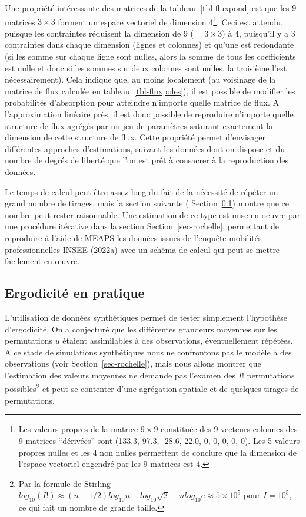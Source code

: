 \documentclass[
  10pt,
  a4paper,
  numbers=noendperiod,
  DIV=12]{scrartcl}
\begin{document}
Une propriété intéressante des matrices de la tableau~\ref{tbl-fluxpond}
est que les 9 matrices \(3 \times 3\) forment un espace vectoriel de
dimension 4\footnote{Les valeurs propres de la matrice \(9 \times 9\)
  constituée des 9 vecteurs colonnes des 9 matrices ``dérivées'' sont
  (133.3, 97.3, -28.6, 22.0, 0, 0, 0, 0, 0). Les 5 valeurs propres
  nulles et les 4 non nulles permettent de conclure que la dimension de
  l'espace vectoriel engendré par les 9 matrices est 4.}. Ceci est
attendu, puisque les contraintes réduisent la dimension de 9
(\(=3\times 3\)) à 4, puisqu'il y a 3 contraintes dans chaque dimension
(lignes et colonnes) et qu'une est redondante (si les somme sur chaque
ligne sont nulles, alors la somme de tous les coefficients est nulle et
donc si les sommes sur deux colonnes sont nulles, la troisième l'est
nécessairement). Cela indique que, au moins localement (au voisinage de
la matrice de flux calculée en tableau~\ref{tbl-fluxpoles}), il est
possible de modifier les probabilités d'absorption pour atteindre
n'importe quelle matrice de flux. A l'approximation linéaire près, il
est donc possible de reproduire n'importe quelle structure de flux
agrégés par un jeu de paramètres saturant exactement la dimension de
cette structure de flux. Cette propriété permet d'envisager différentes
approches d'estimations, suivant les données dont on dispose et du
nombre de degrés de liberté que l'on est prêt à consacrer à la
reproduction des données.

Le temps de calcul peut être assez long du fait de la nécessité de
répéter un grand nombre de tirages, mais la section suivante (
Section~\ref{sec-ergemp}) montre que ce nombre peut rester raisonnable.
Une estimation de ce type est mise en oeuvre par une procédure itérative
dans la section Section~\ref{sec-rochelle}, permettant de reproduire à
l'aide de MEAPS les données issues de l'enquête mobilités
professionnelles INSEE (2022a) avec un schéma de calcul qui peut se
mettre facilement en œuvre.

\hypertarget{sec-ergemp}{%
\subsection{Ergodicité en pratique}\label{sec-ergemp}}

L'utilisation de données synthétiques permet de tester simplement
l'hypothèse d'ergodicité. On a conjecturé que les différentes grandeurs
moyennes sur les permutations \(u\) étaient assimilables à des
observations, éventuellement répétées. A ce stade de simulations
synthétiques nous ne confrontons pas le modèle à des observations (voir
Section~\ref{sec-rochelle}), mais nous allons montrer que l'estimation
des valeurs moyennes ne demande pas l'examen des \(I!\) permutations
possibles\footnote{Par la formule de Stirling
  \(log_{10}(I!) \approx (n +1/2)log_{10} n +log_{10}\sqrt{2} - n log_{10}e \approx 5\times10^5\)
  pour \(I=10^5\), ce qui fait un nombre de grande taille.} et peut se
contenter d'une agrégation spatiale et de quelques tirages de
permutations.
\end{document}

